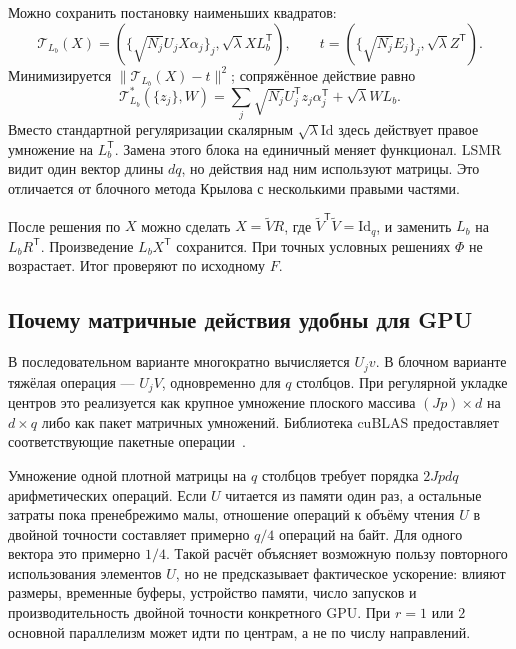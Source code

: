 \documentclass[11pt,a4paper]{article}
\numberwithin{equation}{section}
\theoremstyle{remark}
\newcommand{\Id}{\mathrm{Id}}
\newcommand{\T}{^{\mathsf T}}
\begin{document}
Можно сохранить постановку наименьших квадратов:
\begin{equation}\label{eq:blockaug}
 \mathcal T_{L_b}(X)=
 \left(\{\sqrt{N_j}U_jX\alpha_j\}_j,
       \sqrt\lambda X L_b\T\right),
 \qquad t=\left(\{\sqrt{N_j}E_j\}_j,\sqrt\lambda Z\T\right).
\end{equation}
Минимизируется $\|\mathcal T_{L_b}(X)-t\|^2$; сопряжённое действие равно
\[
 \mathcal T_{L_b}^*(\{z_j\},W)
 =\sum_j\sqrt{N_j}U_j\T z_j\alpha_j\T+\sqrt\lambda W L_b.
\]
Вместо стандартной регуляризации скалярным $\sqrt\lambda\Id$
здесь действует правое умножение на $L_b\T$.
Замена этого блока на единичный меняет функционал.
LSMR видит один вектор длины $dq$, но действия над ним используют матрицы.
Это отличается от блочного метода Крылова с несколькими правыми частями.

После решения по $X$ можно сделать $X=\widetilde V R$, где
$\widetilde V\T\widetilde V=\Id_q$, и заменить $L_b$ на $L_bR\T$.
Произведение $L_bX\T$ сохранится. При точных условных решениях $\Phi$
не возрастает. Итог проверяют по исходному $F$.

\subsection{Почему матричные действия удобны для GPU}
В последовательном варианте многократно вычисляется $U_jv$.
В блочном варианте тяжёлая операция --- $U_jV$, одновременно для $q$
столбцов. При регулярной укладке центров это реализуется как крупное
умножение плоского массива $(Jp)\times d$ на $d\times q$ либо как пакет
матричных умножений. Библиотека cuBLAS предоставляет соответствующие
пакетные операции~\cite{cublas}.

Умножение одной плотной матрицы на $q$ столбцов требует порядка
$2Jpdq$ арифметических операций. Если $U$ читается из памяти один раз,
а остальные затраты пока пренебрежимо малы, отношение операций к объёму
чтения $U$ в двойной точности составляет примерно $q/4$ операций на байт.
Для одного вектора это примерно $1/4$.
Такой расчёт объясняет возможную пользу повторного использования элементов
$U$, но не предсказывает фактическое ускорение: влияют размеры, временные
буферы, устройство памяти, число запусков и производительность двойной
точности конкретного GPU. При $r=1$ или $2$ основной параллелизм может
идти по центрам, а не по числу направлений.
\end{document}

